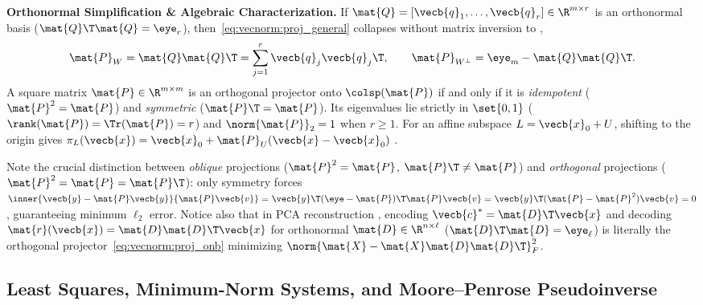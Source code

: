 \documentclass[../../../../master.tex]{subfiles}
\begin{document}
\begin{coremath}
\textbf{Orthonormal Simplification \& Algebraic Characterization.} If $\mat{Q} = [\vecb{q}_1, \dots, \vecb{q}_r] \in \R^{m \times r}$ is an orthonormal basis ($\mat{Q}\T\mat{Q} = \eye_r$), then~\eqref{eq:vecnorm:proj_general} collapses without matrix inversion to , 
\begin{equation}
  \mat{P}_W = \mat{Q}\mat{Q}\T = \sum_{j=1}^r \vecb{q}_j \vecb{q}_j\T, \qquad \mat{P}_{W^\perp} = \eye_m - \mat{Q}\mat{Q}\T.
  \label{eq:vecnorm:proj_onb}
\end{equation}
A square matrix $\mat{P} \in \R^{m \times m}$ is an orthogonal projector onto $\colsp(\mat{P})$ if and only if it is \emph{idempotent} ($\mat{P}^2 = \mat{P}$) and \emph{symmetric} ($\mat{P}\T = \mat{P}$). Its eigenvalues lie strictly in $\set{0, 1}$ ($\rank(\mat{P}) = \Tr(\mat{P}) = r$) and $\norm{\mat{P}}_2 = 1$ when $r \ge 1$. For an affine subspace $L = \vecb{x}_0 + U$, shifting to the origin gives $\pi_L(\vecb{x}) = \vecb{x}_0 + \mat{P}_U(\vecb{x} - \vecb{x}_0)$ .
\end{coremath}

Note the crucial distinction between \emph{oblique} projections ($\mat{P}^2 = \mat{P}$, $\mat{P}\T \neq \mat{P}$) and \emph{orthogonal} projections ($\mat{P}^2 = \mat{P} = \mat{P}\T$): only symmetry forces $\inner{\vecb{y} - \mat{P}\vecb{y}}{\mat{P}\vecb{v}} = \vecb{y}\T(\eye - \mat{P})\T\mat{P}\vecb{v} = \vecb{y}\T(\mat{P} - \mat{P}^2)\vecb{v} = 0$, guaranteeing minimum $\ell_2$ error. Notice also that in PCA reconstruction , encoding $\vecb{c}^* = \mat{D}\T\vecb{x}$ and decoding $\mat{r}(\vecb{x}) = \mat{D}\mat{D}\T\vecb{x}$ for orthonormal $\mat{D} \in \R^{n \times \ell}$ ($\mat{D}\T\mat{D} = \eye_\ell$) is literally the orthogonal projector~\eqref{eq:vecnorm:proj_onb} minimizing $\norm{\mat{X} - \mat{X}\mat{D}\mat{D}\T}_F^2$.

\subsection{Least Squares, Minimum-Norm Systems, and Moore--Penrose Pseudoinverse}
\label{sec:vecnorm:lsq_pinv}
\end{document}
